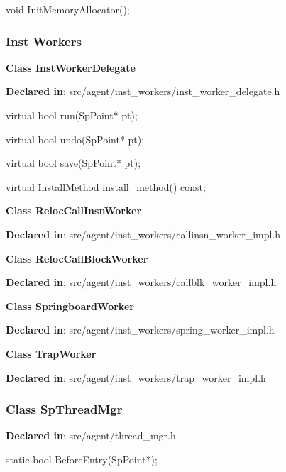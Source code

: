 \begin{apient}
void InitMemoryAllocator();
\end{apient}
\apidesc{
}

\subsubsection{Inst Workers}

\textbf{Class InstWorkerDelegate}

\textbf{Declared in}: src/agent/inst\_workers/inst\_worker\_delegate.h

\begin{apient}
virtual bool run(SpPoint* pt);
\end{apient}

\begin{apient}
virtual bool undo(SpPoint* pt);
\end{apient}

\begin{apient}
virtual bool save(SpPoint* pt);
\end{apient}

\begin{apient}
virtual InstallMethod install_method() const;
\end{apient}

\textbf{Class RelocCallInsnWorker}

\textbf{Declared in}: src/agent/inst\_workers/callinsn\_worker\_impl.h

\textbf{Class RelocCallBlockWorker}

\textbf{Declared in}: src/agent/inst\_workers/callblk\_worker\_impl.h

\textbf{Class SpringboardWorker}

\textbf{Declared in}: src/agent/inst\_workers/spring\_worker\_impl.h

\textbf{Class TrapWorker}

\textbf{Declared in}: src/agent/inst\_workers/trap\_worker\_impl.h


\subsubsection{Class SpThreadMgr}
\textbf{Declared in}: src/agent/thread\_mgr.h

\begin{apient}
static bool BeforeEntry(SpPoint*);
\end{apient}
\apidesc{
}

